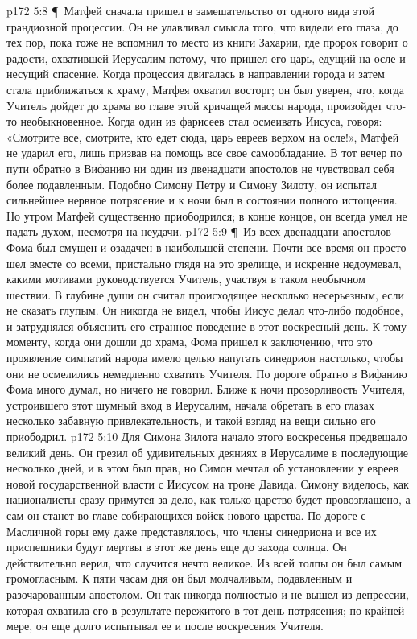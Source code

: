 \vs p172 5:8 \P\ Матфей сначала пришел в замешательство от одного вида этой грандиозной процессии. Он не улавливал смысла того, что видели его глаза, до тех пор, пока тоже не вспомнил то место из книги Захарии, где пророк говорит о радости, охватившей Иерусалим потому, что пришел его царь, едущий на осле и несущий спасение. Когда процессия двигалась в направлении города и затем стала приближаться к храму, Матфея охватил восторг; он был уверен, что, когда Учитель дойдет до храма во главе этой кричащей массы народа, произойдет что\hyp{}то необыкновенное. Когда один из фарисеев стал осмеивать Иисуса, говоря: «Смотрите все, смотрите, кто едет сюда, царь евреев верхом на осле!», Матфей не ударил его, лишь призвав на помощь все свое самообладание. В тот вечер по пути обратно в Вифанию ни один из двенадцати апостолов не чувствовал себя более подавленным. Подобно Симону Петру и Симону Зилоту, он испытал сильнейшее нервное потрясение и к ночи был в состоянии полного истощения. Но утром Матфей существенно приободрился; в конце концов, он всегда умел не падать духом, несмотря на неудачи.
\vs p172 5:9 \P\ Из всех двенадцати апостолов Фома был смущен и озадачен в наибольшей степени. Почти все время он просто шел вместе со всеми, пристально глядя на это зрелище, и искренне недоумевал, какими мотивами руководствуется Учитель, участвуя в таком необычном шествии. В глубине души он считал происходящее несколько несерьезным, если не сказать глупым. Он никогда не видел, чтобы Иисус делал что\hyp{}либо подобное, и затруднялся объяснить его странное поведение в этот воскресный день. К тому моменту, когда они дошли до храма, Фома пришел к заключению, что это проявление симпатий народа имело целью напугать синедрион настолько, чтобы они не осмелились немедленно схватить Учителя. По дороге обратно в Вифанию Фома много думал, но ничего не говорил. Ближе к ночи прозорливость Учителя, устроившего этот шумный вход в Иерусалим, начала обретать в его глазах несколько забавную привлекательность, и такой взгляд на вещи сильно его приободрил.
\vs p172 5:10 Для Симона Зилота начало этого воскресенья предвещало великий день. Он грезил об удивительных деяниях в Иерусалиме в последующие несколько дней, и в этом был прав, но Симон мечтал об установлении у евреев новой государственной власти с Иисусом на троне Давида. Симону виделось, как националисты сразу примутся за дело, как только царство будет провозглашено, а сам он станет во главе собирающихся войск нового царства. По дороге с Масличной горы ему даже представлялось, что члены синедриона и все их приспешники будут мертвы в этот же день еще до захода солнца. Он действительно верил, что случится нечто великое. Из всей толпы он был самым громогласным. К пяти часам дня он был молчаливым, подавленным и разочарованным апостолом. Он так никогда полностью и не вышел из депрессии, которая охватила его в результате пережитого в тот день потрясения; по крайней мере, он еще долго испытывал ее и после воскресения Учителя.
